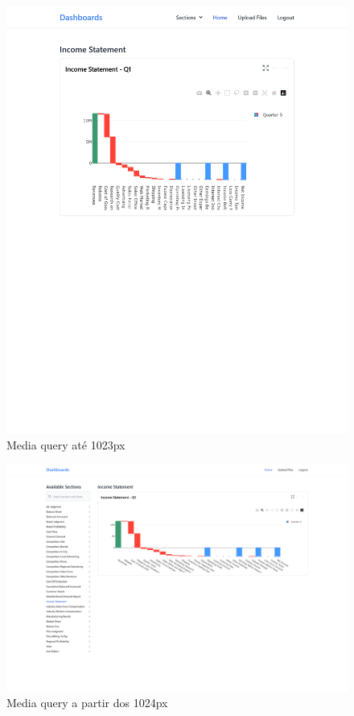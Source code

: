\begin{figure}[H]
    \centering
    \includegraphics[width=\textwidth]{./img/res_1023}
 \caption{Media query até 1023px}
\end{figure}


\begin{figure}[H]
    \centering
    \includegraphics[width=\textwidth]{./img/res_1920}
 \caption{Media query a partir dos 1024px}
\end{figure}

